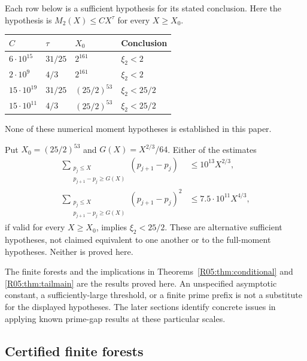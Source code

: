 \documentclass[11pt,a4paper]{article}
\theoremstyle{definition}\newtheorem{definition}[theorem]{Definition}
\theoremstyle{remark}\newtheorem{remark}[theorem]{Remark}
\begin{document}
\begin{mainthm}\label{R05:thm:conditional}
Each row below is a sufficient hypothesis for its stated conclusion.
Here the hypothesis is $M_2(X)\le C X^\tau$ for every $X\ge X_0$.
\begin{center}
\begin{tabular}{@{}llll@{}}
\toprule
$C$&$\tau$&$X_0$&Conclusion\\\midrule
$6\cdot10^{15}$&$31/25$&$2^{161}$&$\xi_2<2$\\
$2\cdot10^9$&$4/3$&$2^{161}$&$\xi_2<2$\\
$15\cdot10^{19}$&$31/25$&$(25/2)^{53}$&$\xi_2<25/2$\\
$15\cdot10^{11}$&$4/3$&$(25/2)^{53}$&$\xi_2<25/2$\\
\bottomrule
\end{tabular}
\end{center}
None of these numerical moment hypotheses is established in this paper.
\end{mainthm}

\begin{mainthm}\label{R05:thm:tailmain}
Put $X_0=(25/2)^{53}$ and $G(X)=X^{2/3}/64$. Either of the estimates
\begin{align*}
 \sum_{\substack{p_j\le X\\p_{j+1}-p_j\ge G(X)}}(p_{j+1}-p_j)
   &\le10^{13}X^{2/3},\\
 \sum_{\substack{p_j\le X\\p_{j+1}-p_j\ge G(X)}}(p_{j+1}-p_j)^2
   &\le7.5\cdot10^{11}X^{4/3},
\end{align*}
if valid for every $X\ge X_0$, implies $\xi_2<25/2$.
These are alternative sufficient hypotheses, not claimed equivalent
to one another or to the full-moment hypotheses. Neither is proved here.
\end{mainthm}

The finite forests and the implications in
Theorems~\ref{R05:thm:conditional} and \ref{R05:thm:tailmain} are the results proved here.
An unspecified asymptotic constant, a sufficiently-large threshold,
or a finite prime prefix is not a substitute for the displayed
hypotheses. The later sections identify concrete issues in applying
known prime-gap results at these particular scales.

\subsection{Certified finite forests}
\label{R05:sec:finite}
\end{document}
